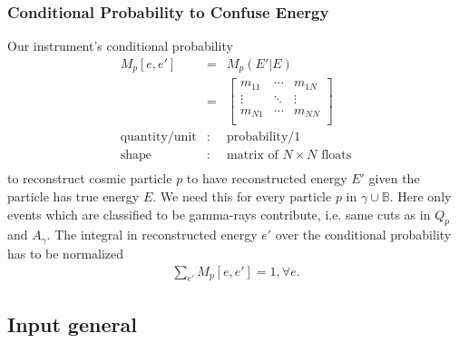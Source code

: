 \documentclass{article}%
\begin{document}
            \subsubsection*{Conditional Probability to Confuse Energy}
                Our instrument's conditional probability
                \begin{eqnarray*}
                    M_p[e, e'] &=& M_p(E' \vert E)\\
                    &=&
                      \left[ {\begin{array}{ccc}
                        m_{11} & \cdots & m_{1N}\\
                        \vdots & \ddots & \vdots\\
                        m_{N1} & \cdots & m_{NN}\\
                      \end{array} } \right]\\
                    \text{quantity}/\text{unit} &:& \text{probability}/1\\
                    \text{shape} &:& \text{matrix of}\,\,N \times N \,\,\text{floats}\\
                \end{eqnarray*}
                to reconstruct cosmic particle $p$ to have reconstructed energy $E'$ given the particle has true energy $E$.
                We need this for every particle $p$ in $\gamma \cup \mathbb{B}$.
                Here only events which are classified to be gamma-rays contribute, i.e. same cuts as in $Q_p$ and $A_\gamma$.
                The integral in reconstructed energy $e'$ over the conditional probability has to be normalized
                \begin{eqnarray*}
                    \sum_{e'} M_p[e, e'] = 1, \forall e.
                \end{eqnarray*}
        \subsection{Input general}
\end{document}

